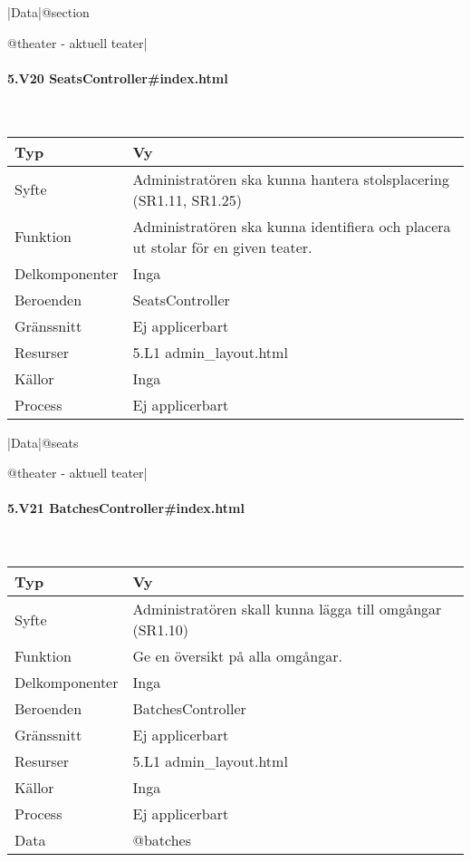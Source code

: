 \documentclass[a4paper, twoside, 11pt, titlepage]{article}
\begin{document}
			|Data|@section

			@theater - aktuell teater|

			\paragraph{5.V20 SeatsController\#index.html}\

			\begin {table} [ht] \begin{tabular} {  p{3.5cm} p{9.6cm} }
				\hline
				Typ & Vy  \\
				\hline
				Syfte & Administratören ska kunna hantera stolsplacering (SR1.11, SR1.25)  \\
				\hline
				Funktion & Administratören ska kunna identifiera och placera ut stolar för en given teater.  \\
				\hline
				Delkomponenter & Inga  \\
				\hline
				Beroenden & SeatsController  \\
				\hline
				Gränssnitt & Ej applicerbart  \\
				\hline
				Resurser & 5.L1 admin\_layout.html  \\
				\hline
				Källor & Inga  \\
				\hline
				Process & Ej applicerbart  \\
				\hline
			\end{tabular} \end{table} \FloatBarrier
			\vspace{6mm}

			|Data|@seats

			@theater - aktuell teater|

			\paragraph{5.V21 BatchesController\#index.html}\

			\begin {table} [ht] \begin{tabular} {  p{3.5cm} p{9.6cm} }
				\hline
				Typ & Vy  \\
				\hline
				Syfte & Administratören skall kunna lägga till omgångar (SR1.10)  \\
				\hline
				Funktion & Ge en översikt på alla omgångar.  \\
				\hline
				Delkomponenter & Inga  \\
				\hline
				Beroenden & BatchesController  \\
				\hline
				Gränssnitt & Ej applicerbart  \\
				\hline
				Resurser & 5.L1 admin\_layout.html  \\
				\hline
				Källor & Inga  \\
				\hline
				Process & Ej applicerbart  \\
				\hline
				Data & @batches  \\
				\hline
			\end{tabular} \end{table} \FloatBarrier
\end{document}
